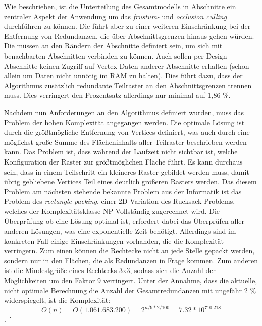 Wie beschrieben, ist die Unterteilung des Gesamtmodells in Abschnitte ein zentraler Aspekt der Anwendung um das \textit{frustum-} und \textit{occlusion culling} durchführen zu können. Die führt aber zu einer weiteren Einschränkung bei der Entfernung von Redundanzen, die über Abschnittsgrenzen hinaus gehen würden. Die müssen an den Rändern der Abschnitte definiert sein, um sich mit benachbarten Abschnitten verbinden zu können. Auch sollen per Design Abschnitte keinen Zugriff auf Vertex-Daten anderer Abschnitte erhalten (schon allein um Daten nicht unnötig im RAM zu halten). Dies führt dazu, dass der Algorithmus zusätzlich redundante Teilraster an den Abschnittsgrenzen trennen muss. Dies verringert den Prozentsatz allerdings nur minimal auf 1,86 \%.

Nachdem nun Anforderungen an den Algorithmus definiert wurden, muss das Problem der hohen Komplexität angegangen werden. Die optimale Lösung ist durch die größtmögliche Entfernung von Vertices definiert, was auch durch eine möglichst große Summe des Flächeninhalts aller Teilraster beschrieben werden kann. Das Problem ist, dass während der Laufzeit nicht sichtbar ist, welche Konfiguration der Raster zur größtmöglichen Fläche führt. Es kann durchaus sein, dass in einem Teilschritt ein kleineres Raster gebildet werden muss, damit übrig gebliebene Vertices Teil eines deutlich größeren Rasters werden. Das diesem Problem am nächsten stehende bekannte Problem aus der Informatik ist das Problem des \textit{rectangle packing}, einer 2D Variation des Rucksack-Problems, welches der Komplexitätsklasse NP-Vollständig zugerechnet wird. Die Überprüfung ob eine Lösung optimal ist, erfordert dabei das Überprüfen aller anderen Lösungen, was eine exponentielle Zeit benötigt. Allerdings sind im konkreten Fall einige Einschränkungen vorhanden, die die Komplexität verringern. Zum einen können die Rechtecke nicht an jede Stelle gepackt werden, sondern nur in den Flächen, die als Redundanzen in Frage kommen. Zum anderen ist die Mindestgröße eines Rechtecks 3x3, sodass sich die Anzahl der Möglichkeiten um den Faktor 9 verringert. Unter der Annahme, dass die aktuelle, nicht optimale Berechnung die Anzahl der Gesamtredundanzen mit ungefähr 2 \% widerspiegelt, ist die Komplexität: \[O(n) = O(1.061.683.200) = 2^{n / 9 * 2 / 100} = 7.32 * 10^{710.218}\].
´
